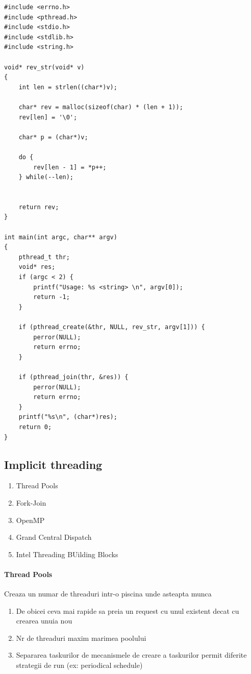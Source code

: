 \documentclass{article}
\begin{document}
\begin{center}
    \begin{lstlisting}
#include <errno.h>
#include <pthread.h>
#include <stdio.h>
#include <stdlib.h>
#include <string.h>

void* rev_str(void* v)
{
    int len = strlen((char*)v);

    char* rev = malloc(sizeof(char) * (len + 1));
    rev[len] = '\0';

    char* p = (char*)v;

    do {
        rev[len - 1] = *p++;
    } while(--len);


    return rev;
}

int main(int argc, char** argv)
{
    pthread_t thr;
    void* res;
    if (argc < 2) {
        printf("Usage: %s <string> \n", argv[0]);
        return -1;
    }

    if (pthread_create(&thr, NULL, rev_str, argv[1])) {
        perror(NULL);
        return errno;
    }

    if (pthread_join(thr, &res)) {
        perror(NULL);
        return errno;
    }
    printf("%s\n", (char*)res);
    return 0;
}
    \end{lstlisting}
\end{center}

\subsection*{Implicit threading}
\begin{enumerate}
    \item Thread Pools
    \item Fork-Join
    \item OpenMP
    \item Grand Central Dispatch
    \item Intel Threading BUilding Blocks
\end{enumerate}

\paragraph*{Thread Pools} Creaza un numar de threaduri intr-o piscina unde asteapta munca
\begin{enumerate}
    \item De obicei ceva mai rapide sa preia un request cu unul existent decat cu crearea unuia nou
    \item Nr de threaduri maxim marimea poolului
    \item Separarea taskurilor de mecanismele de creare a taskurilor permit diferite strategii de run (ex: periodical schedule)
\end{enumerate}
\end{document}
